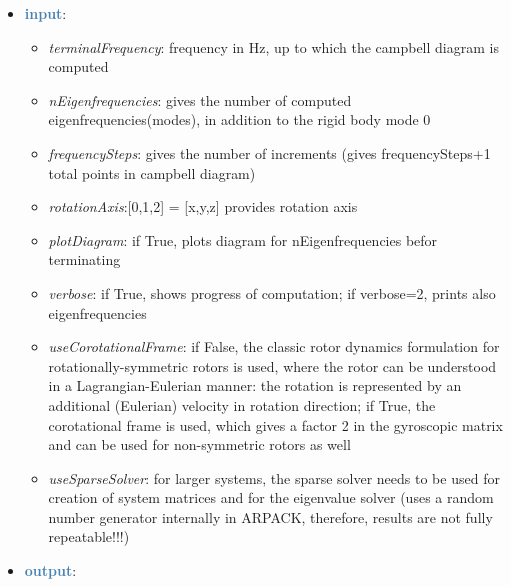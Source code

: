 \begin{itemize}[leftmargin=1.4cm]
\begin{itemize}[leftmargin=1.4cm]
\begin{itemize}[leftmargin=1.4cm]
\begin{itemize}[leftmargin=0.5cm]
\begin{itemize}[leftmargin=1.4cm]
\begin{itemize}[leftmargin=1.4cm]
\begin{itemize}[leftmargin=1.4cm]
\begin{itemize}[leftmargin=0.5cm]
\begin{itemize}[leftmargin=0.7cm]
\begin{itemize}[leftmargin=1.2cm]
\setlength{\itemindent}{-0.7cm}
\item[]compute Campbell diagram for given mechanical system
\item[]create a first order system Axd + Bx = 0 with x= [q,qd]' and compute eigenvalues
\item[]takes mass M, stiffness K and gyroscopic matrix G from FEMinterface
\item[]currently only uses dense matrices, so it is limited to approx. 5000 unknowns!
\end{itemize}
\item[--]\textcolor{steelblue}{\bf input}: \vspace{-6pt}
\begin{itemize}[leftmargin=1.2cm]
\setlength{\itemindent}{-0.7cm}
\item[]{\it terminalFrequency}: frequency in Hz, up to which the campbell diagram is computed
\item[]{\it nEigenfrequencies}: gives the number of computed eigenfrequencies(modes), in addition to the rigid body mode 0
\item[]{\it frequencySteps}: gives the number of increments (gives frequencySteps+1 total points in campbell diagram)
\item[]{\it rotationAxis}:[0,1,2] = [x,y,z] provides rotation axis
\item[]{\it plotDiagram}: if True, plots diagram for nEigenfrequencies befor terminating
\item[]{\it verbose}: if True, shows progress of computation; if verbose=2, prints also eigenfrequencies
\item[]{\it useCorotationalFrame}: if False, the classic rotor dynamics formulation for rotationally-symmetric rotors is used, where the rotor can be understood in a Lagrangian-Eulerian manner: the rotation is represented by an additional (Eulerian) velocity in rotation direction; if True, the corotational frame is used, which gives a factor 2 in the gyroscopic matrix and can be used for non-symmetric rotors as well
\item[]{\it useSparseSolver}: for larger systems, the sparse solver needs to be used for creation of system matrices and for the eigenvalue solver (uses a random number generator internally in ARPACK, therefore, results are not fully repeatable!!!)
\end{itemize}
\item[--]\textcolor{steelblue}{\bf output}: \vspace{-6pt}

\end{itemize}
\end{itemize}
\end{itemize}
\end{itemize}
\end{itemize}
\end{itemize}
\end{itemize}
\end{itemize}
\end{itemize}
